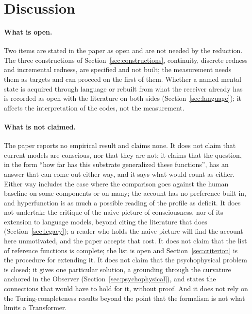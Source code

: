 \section{Discussion}
\label{sec:discussion}
\label{sec:reader}
\label{sec:difficulties}

\paragraph{What is open.}
Two items are stated in the paper as open and are not needed by the reduction. The three constructions of
Section~\ref{sec:constructions}, continuity, discrete redness and incremental redness, are specified
and not built; the measurement needs them as targets and can proceed on the first of them. Whether a
named mental state is acquired through language or rebuilt from what the receiver already has is
recorded as open with the literature on both sides (Section~\ref{sec:language}); it affects the
interpretation of the codes, not the measurement.

\paragraph{What is not claimed.}
The paper reports no empirical result and claims none. It does not claim that current models are
conscious, nor that they are not; it claims that the
question, in the form ``how far has this substrate generalized these functions'', has an answer that
can come out either way, and it says what would count as either. Either way includes the case where
the comparison goes against the human baseline on some components or on many; the account has no
preference built in, and hyperfunction is as much a possible reading of the profile as deficit. It does not undertake the critique of the naive picture of consciousness, nor of its extension to
language models, beyond citing the literature that does (Section~\ref{sec:legacy}); a reader who
holds the naive picture will find the account here unmotivated, and the paper accepts that cost. It
does not claim that the list of
reference functions is complete; the list is open and Section~\ref{sec:criterion} is the procedure for
extending it. It does not claim that the psychophysical problem is closed; it gives one particular solution,
a grounding through the curvature anchored in the Observer (Section~\ref{sec:psychophysical}), and
states the connections that would have to hold for it, without proof. And it does not rely on the Turing-completeness results
beyond the point that the formalism is not what limits a Transformer.

